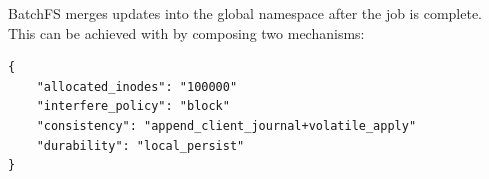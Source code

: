 BatchFS merges updates into the global namespace after the job is complete.
This can be achieved with by composing two mechanisms: 

\begin{listing}[h]
\begin{verbatim}
{     
    "allocated_inodes": "100000"
    "interfere_policy": "block"
    "consistency": "append_client_journal+volatile_apply"
    "durability": "local_persist"
}
\end{verbatim}
\end{listing}
